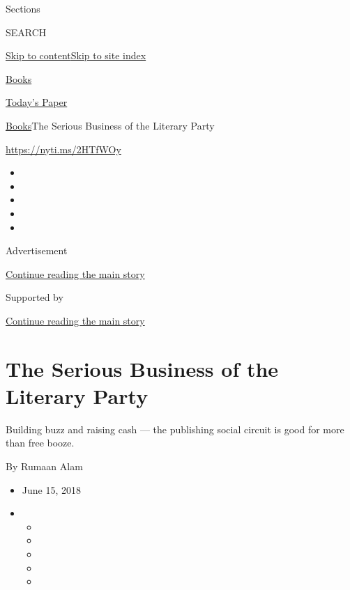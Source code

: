 Sections

SEARCH

\protect\hyperlink{site-content}{Skip to
content}\protect\hyperlink{site-index}{Skip to site index}

\href{https://www.nytimes3xbfgragh.onion/section/books}{Books}

\href{https://myaccount.nytimes3xbfgragh.onion/auth/login?response_type=cookie\&client_id=vi}{}

\href{https://www.nytimes3xbfgragh.onion/section/todayspaper}{Today's
Paper}

\href{/section/books}{Books}\textbar{}The Serious Business of the
Literary Party

\url{https://nyti.ms/2HTfWOy}

\begin{itemize}
\item
\item
\item
\item
\item
\end{itemize}

Advertisement

\protect\hyperlink{after-top}{Continue reading the main story}

Supported by

\protect\hyperlink{after-sponsor}{Continue reading the main story}

\hypertarget{the-serious-business-of-the-literary-party}{%
\section{The Serious Business of the Literary
Party}\label{the-serious-business-of-the-literary-party}}

Building buzz and raising cash --- the publishing social circuit is good
for more than free booze.

By Rumaan Alam

\begin{itemize}
\item
  June 15, 2018
\item
  \begin{itemize}
  \item
  \item
  \item
  \item
  \item
  \end{itemize}
\end{itemize}

